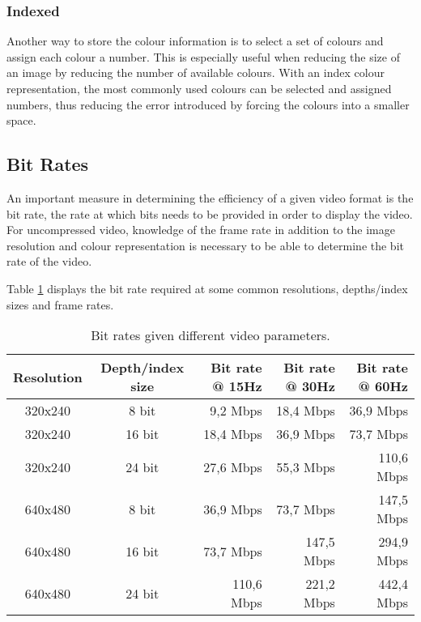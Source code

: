 \subsubsection{Indexed}
Another way to store the colour information is to select a set of colours and assign each colour a number.
This is especially useful when reducing the size of an image by reducing the number of available colours.
With an index colour representation, the most commonly used colours can be selected and assigned numbers, thus reducing the error introduced by forcing the colours into a smaller space.

\subsection{Bit Rates}
An important measure in determining the efficiency of a given video format is the bit rate, the rate at which bits needs to be provided in order to display the video.
For uncompressed video, knowledge of the frame rate in addition to the image resolution and colour representation is necessary to be able to determine the bit rate of the video.

Table \ref{tab:BitRates} displays the bit rate required at some common resolutions, depths/index sizes and frame rates.
\begin{table}[h]
    \centering
    \begin{tabular}{ccrrr}
        Resolution & Depth/index size & Bit rate @ 15Hz & Bit rate @ 30Hz & Bit rate @ 60Hz \\
        \hline
        320x240 & 8 bit & 9,2 Mbps   & 18,4 Mbps  & 36,9 Mbps  \\
        320x240 & 16 bit & 18,4 Mbps  & 36,9 Mbps  & 73,7 Mbps  \\
        320x240 & 24 bit & 27,6 Mbps  & 55,3 Mbps  & 110,6 Mbps \\
        640x480 & 8 bit & 36,9 Mbps  & 73,7 Mbps  & 147,5 Mbps \\
        640x480 & 16 bit & 73,7 Mbps  & 147,5 Mbps & 294,9 Mbps \\
        640x480 & 24 bit & 110,6 Mbps & 221,2 Mbps & 442,4 Mbps
    \end{tabular}
    \caption{Bit rates given different video parameters.}
    \label{tab:BitRates}
\end{table}
